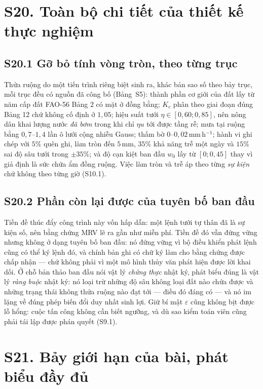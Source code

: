 \section*{S20. Toàn bộ chi tiết của thiết kế thực nghiệm}

\subsection*{S20.1 Gỡ bỏ tính vòng tròn, theo từng trục}

Thửa ruộng do một tiến trình riêng biệt sinh ra, khác bản sao số theo bảy trục, mỗi trục đều có
nguồn đã công bố (Bảng~S5): thành phần cơ giới của đất lấy từ năm cấp đất FAO-56 Bảng 2 có mặt ở
đồng bằng; $K_c$ phân theo giai đoạn đúng Bảng 12 chứ không cố định ở $1{,}05$; hiệu suất tưới
$\eta\in[0{,}60;0{,}85]$, nên nông dân khai lượng nước \emph{đã bơm} trong khi chỉ $\eta u$ tới
được tầng rễ; mưa tại ruộng bằng $0{,}7$--$1{,}4$ lần ô lưới cộng nhiễu Gauss; thấm bờ
$0$--$0{,}02$\,mm\,h$^{-1}$; hành vi ghi chép với $5\%$ quên ghi, làm tròn đến $5$\,mm, $35\%$
khả năng trễ một ngày và $15\%$ sai độ sâu tưới trong $\pm35\%$; và độ cạn kiệt ban đầu $w_0$ lấy từ
$[0;0{,}45]$ thay vì giả định là sức chứa ẩm đồng ruộng. Việc làm tròn và trễ áp theo từng
\emph{sự kiện} chứ không theo từng giờ (S10.1).

\subsection*{S20.2 Phần còn lại được của tuyên bố ban đầu}

Tiền đề thúc đẩy công trình này vốn hấp dẫn: một lệnh tưới tự thân đã là sự kiện số, nên bằng
chứng MRV lẽ ra gần như miễn phí. Tiền đề đó vẫn đứng vững nhưng không ở dạng tuyên bố ban
đầu: nó đứng vững vì bộ điều khiển phát lệnh cũng có thể ký lệnh đó, và chính bản ghi có chữ
ký làm cho bằng chứng được chấp nhận --- chứ không phải vì một mô hình thủy văn phát hiện được
lời khai dối. Ở chỗ bản thảo ban đầu nói vật lý \emph{chứng thực} nhật ký, phát biểu đúng là
vật lý \emph{ràng buộc} nhật ký: nó loại trừ những độ sâu không loại đất nào chứa được và
những trạng thái không thửa ruộng nào đạt tới --- điều đó đáng có --- và nó im lặng về đúng
phép biến đổi duy nhất sinh lợi. Giữ bí mật $\varepsilon$ cũng không bịt được lỗ hổng: cuộc tấn
công không cần biết ngưỡng, và dù sao kiểm toán viên cũng phải tái lập được phán quyết
(S9.1).

\section*{S21. Bảy giới hạn của bài, phát biểu đầy đủ}

